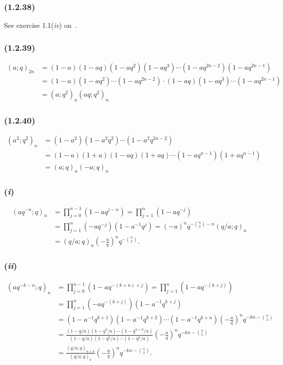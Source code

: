 \subsubsection*{(1.2.38)}
See exercise 1.1(\textit{iv}) on~.

\subsubsection*{(1.2.39)}
\begin{align*}
    (a;q)_{2n}&=(1-a)(1-aq)(1-aq^2)(1-aq^3)\cdots(1-aq^{2n-2})(1-aq^{2n-1})\\
    &=(1-a)(1-aq^2)\cdots(1-aq^{2n-2})\cdot(1-aq)(1-aq^3)\cdots(1-aq^{2n-1})\\
    &=(a;q^2)_n (aq;q^2)_n
\end{align*}

\subsubsection*{(1.2.40)}
\begin{align*}
    (a^2;q^2)_n &= (1-a^2)(1-a^2 q^2)\cdots(1-a^2 q^{2n-2})\\
    &= (1-a)(1+a)(1-aq)(1+aq)\cdots (1-aq^{n-1})(1+aq^{n-1})\\
    &= (a;q)_n (-a;q)_n
\end{align*}

\subsubsection*{(\textit{i})}
\begin{align*}
    (aq^{-n};q)_n &= \prod_{j=0}^{n-1} (1-aq^{j-n}) = \prod_{j=1}^{n} (1-aq^{-j}) \\
    &= \prod_{j=1}^n (-aq^{-j})(1-a^{-1}q^j) = (-a)^n q^{-\binom{n}{2}-n} (q/a;q)_n\\
    &= (q/a;q)_n \left(-\frac{a}{q}\right)^n q^{-\binom{n}{2}}.
\end{align*}

\subsubsection*{(\textit{ii})}
\begin{align*}
    (aq^{-k-n};q)_n &= \prod_{j=0}^{n-1} (1-aq^{-(k+n)+j}) = \prod_{j=1}^{n} (1-aq^{-(k+j)}) \\
    &=  \prod_{j=1}^{n}(-aq^{-(k+j)}) (1-a^{-1}q^{k+j}) \\
    &= (1-a^{-1}q^{k+1})(1-a^{-1}q^{k+2})\cdots(1-a^{-1}q^{k+n})\left(-\frac{a}{q}\right)^n q^{-kn-\binom{n}{2}}\\
    &= \frac{(1-q/a)(1-q^2/a)\cdots(1-q^{n+k}/a)}{(1-q/a)(1-q^2/a)\cdots(1-q^k/a)}\left(-\frac{a}{q}\right)^n q^{-kn-\binom{n}{2}}\\
    &= \frac{(q/a;q)_{n+k}}{(q/a;q)_k} \left(-\frac{a}{q}\right)^n q^{-kn-\binom{n}{2}}.
\end{align*}


